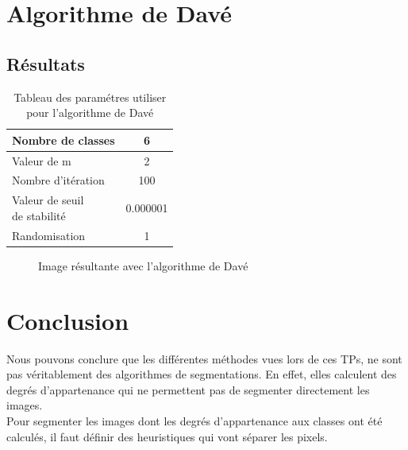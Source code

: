 \documentclass[a4paper,11pt]{article}
\begin{document}
\section{Algorithme de Davé}

\subsection{Résultats}

\begin{table}[H]
  \begin{center}
    \begin{tabular}{|l|c|}
      \hline
      Nombre de classes & 6 \\
      \hline
      Valeur de m & 2 \\
      \hline
      Nombre d'itération & 100 \\
      \hline
      \shortstack{ Valeur de seuil \\ de stabilité }  & 0.000001 \\
      \hline
      Randomisation & 1 \\
      \hline
    \end{tabular}
    \caption{Tableau des paramétres utiliser pour l'algorithme de Davé}
  \end{center}
\end{table}


\begin{figure}[H]
  \begin{center} 
    \caption{Image résultante avec l'algorithme de Davé}
  \end{center}
\end{figure}

\section*{Conclusion}

Nous pouvons conclure que les différentes méthodes vues lors de ces TPs, ne sont 
pas véritablement des algorithmes de segmentations. En effet, elles calculent 
des degrés d'appartenance qui ne permettent pas de segmenter directement les 
images.\\

Pour segmenter les images dont les degrés d'appartenance aux classes ont été calculés,
il faut définir des heuristiques qui vont séparer les pixels.\\
\end{document}
